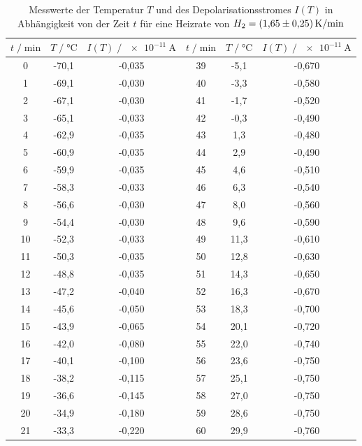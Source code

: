   \begin{table}
    \centering
    \caption{Messwerte der Temperatur $T$ und des Depolarisationsstromes $I(T)$ in Abhängigkeit von der Zeit $t$ für eine
    Heizrate von $H_2 = \SI{1.65 +- 0.25}{\kelvin\per\minute}$}
    \label{tab:mess2}
    \begin{tabular}{c c c c c c}
    \toprule
    $t \;/\; \si{\minute}$ & $T \;/\; \si{\celsius}$ & $I(T) \;/\; \SI{e-11}{\ampere}$ & 
    $t \;/\; \si{\minute}$ & $T \;/\; \si{\celsius}$ & $I(T) \;/\; \SI{e-11}{\ampere}$ \\
    \midrule
        0 & -70,1 & -0,035 & 39 & -5,1 & -0,670 \\
        1 & -69,1 & -0,030 & 40 & -3,3 & -0,580 \\
        2 & -67,1 & -0,030 & 41 & -1,7 & -0,520 \\
        3 & -65,1 & -0,033 & 42 & -0,3 & -0,490 \\
        4 & -62,9 & -0,035 & 43 &  1,3 & -0,480 \\
        5 & -60,9 & -0,035 & 44 &  2,9 & -0,490 \\
        6 & -59,9 & -0,035 & 45 &  4,6 & -0,510 \\
        7 & -58,3 & -0,033 & 46 &  6,3 & -0,540 \\
        8 & -56,6 & -0,030 & 47 &  8,0 & -0,560 \\
        9 & -54,4 & -0,030 & 48 &  9,6 & -0,590 \\
       10 & -52,3 & -0,033 & 49 & 11,3 & -0,610 \\
       11 & -50,3 & -0,035 & 50 & 12,8 & -0,630 \\
       12 & -48,8 & -0,035 & 51 & 14,3 & -0,650 \\
       13 & -47,2 & -0,040 & 52 & 16,3 & -0,670 \\
       14 & -45,6 & -0,050 & 53 & 18,3 & -0,700 \\
       15 & -43,9 & -0,065 & 54 & 20,1 & -0,720 \\
       16 & -42,0 & -0,080 & 55 & 22,0 & -0,740 \\
       17 & -40,1 & -0,100 & 56 & 23,6 & -0,750 \\
       18 & -38,2 & -0,115 & 57 & 25,1 & -0,750 \\
       19 & -36,6 & -0,145 & 58 & 27,0 & -0,750 \\
       20 & -34,9 & -0,180 & 59 & 28,6 & -0,750 \\
       21 & -33,3 & -0,220 & 60 & 29,9 & -0,760 \\

\end{tabular}
\end{table}
